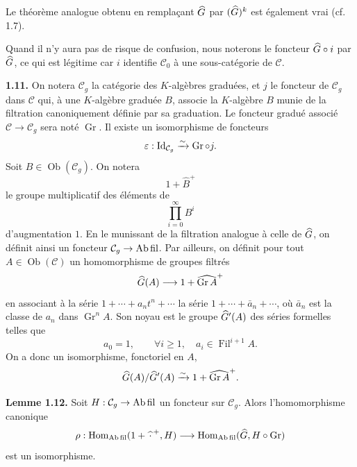 \documentclass[11pt]{article}
\newcommand{\Fil}{\operatorname{Fil}}
\begin{document}
Le théorème analogue obtenu en remplaçant \(\widehat G\) par \((\widehat G)^k\) est également vrai (cf. 1.7).

Quand il n'y aura pas de risque de confusion, nous noterons le foncteur \(\widehat G\circ i\) par \(\widehat G\), ce qui est légitime car \(i\) identifie \(\mathcal C_0\) à une sous-catégorie de \(\mathcal C\).

\textbf{1.11.} On notera \(\mathcal C_g\) la catégorie des \(K\)-algèbres graduées, et \(j\) le foncteur de \(\mathcal C_g\) dans \(\mathcal C\) qui, à une \(K\)-algèbre graduée \(B\), associe la \(K\)-algèbre \(B\) munie de la filtration canoniquement définie par sa graduation. Le foncteur gradué associé \(\mathcal C\to\mathcal C_g\) sera noté \(\operatorname{Gr}\). Il existe un isomorphisme de foncteurs
\[
  \varepsilon:\operatorname{Id}_{\mathcal C_g}\xrightarrow{\sim}\operatorname{Gr}\circ j.
\]
Soit \(B\in\operatorname{Ob}(\mathcal C_g)\). On notera
\[
  1+\widehat B^+
\]
le groupe multiplicatif des éléments de
\[
  \prod_{i=0}^{\infty}B^i
\]
d'augmentation \(1\). En le munissant de la filtration analogue à celle de \(\widehat G\), on définit ainsi un foncteur \(\mathcal C_g\to\mathrm{Ab\,fil}\). Par ailleurs, on définit pour tout \(A\in\operatorname{Ob}(\mathcal C)\) un homomorphisme de groupes filtrés
\[
  \widehat G(A)\longrightarrow 1+\widehat{\operatorname{Gr}A}^{+}
\]
en associant à la série \(1+\cdots+a_nt^n+\cdots\) la série \(1+\cdots+\bar a_n+\cdots\), où \(\bar a_n\) est la classe de \(a_n\) dans \(\operatorname{Gr}^nA\). Son noyau est le groupe \(\widehat G'(A)\) des séries formelles telles que
\[
  a_0=1,\qquad \forall i\geq1,\quad a_i\in\Fil^{i+1}A.
\]
On a donc un isomorphisme, fonctoriel en \(A\),
\[
  \widehat G(A)/\widehat G'(A)\xrightarrow{\sim}1+\widehat{\operatorname{Gr}A}^{+}.
\]

\textbf{Lemme 1.12.} Soit \(H:\mathcal C_g\to\mathrm{Ab\,fil}\) un foncteur sur \(\mathcal C_g\). Alors l'homomorphisme canonique
\[
  \rho:\operatorname{Hom}_{\mathrm{Ab\,fil}}(1+\widehat{\,\cdot\,}^{+},H)
  \longrightarrow
  \operatorname{Hom}_{\mathrm{Ab\,fil}}(\widehat G,H\circ\operatorname{Gr})
\]
est un isomorphisme.
\end{document}
